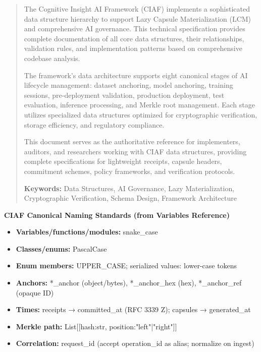 \documentclass[12pt,a4paper]{article}
\begin{document}
\begin{abstract}
The Cognitive Insight AI Framework (CIAF) implements a sophisticated data structure hierarchy to support Lazy Capsule Materialization (LCM\texttrademark) and comprehensive AI governance. This technical specification provides complete documentation of all core data structures, their relationships, validation rules, and implementation patterns based on comprehensive codebase analysis.

The framework's data architecture supports eight canonical stages of AI lifecycle management: dataset anchoring, model anchoring, training sessions, pre-deployment validation, production deployment, test evaluation, inference processing, and Merkle root management. Each stage utilizes specialized data structures optimized for cryptographic verification, storage efficiency, and regulatory compliance.

This document serves as the authoritative reference for implementers, auditors, and researchers working with CIAF data structures, providing complete specifications for lightweight receipts, capsule headers, commitment schemes, policy frameworks, and verification protocols.

\textbf{Keywords:} Data Structures, AI Governance, Lazy Materialization, Cryptographic Verification, Schema Design, Framework Architecture
\end{abstract}

\begin{technicalbox}
\textbf{CIAF Canonical Naming Standards (from Variables Reference)}
\begin{itemize}
\item \textbf{Variables/functions/modules:} snake\_case
\item \textbf{Classes/enums:} PascalCase  
\item \textbf{Enum members:} UPPER\_CASE; serialized values: lower-case tokens
\item \textbf{Anchors:} *\_anchor (object/bytes), *\_anchor\_hex (hex), *\_anchor\_ref (opaque ID)
\item \textbf{Times:} receipts → committed\_at (RFC 3339 Z); capsules → generated\_at
\item \textbf{Merkle path:} List[[hash:str, position:"left"|"right"]]
\item \textbf{Correlation:} request\_id (accept operation\_id as alias; normalize on ingest)
\end{itemize}
\end{technicalbox}
\end{document}
